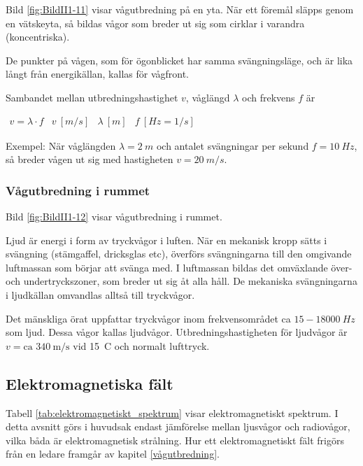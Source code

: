 Bild \ref{fig:BildII1-11} visar vågutbredning på en yta.
När ett föremål släpps genom en vätskeyta, så bildas vågor som breder ut sig
som cirklar i varandra (koncentriska).

De punkter på vågen, som för ögonblicket har samma svängningsläge, och är lika
långt från energikällan, kallas för vågfront.

Sambandet mellan utbredningshastighet \(v\), våglängd \(\lambda\) och frekvens
\(f\) är

\(
\begin{array}{llll}
v = \lambda \cdot f & v \ [m/s] & \lambda \ [m] & f \ [Hz=1/s]
\end{array}
\)

Exempel: När våglängden \(\lambda = 2\ m\) och antalet svängningar per sekund
\(f = 10\ Hz\), så breder vågen ut sig med hastigheten \(v = 20\ m/s\).

\subsubsection{Vågutbredning i rummet}


Bild \ref{fig:BildII1-12} visar vågutbredning i rummet.

Ljud är energi i form av tryckvågor i luften.
När en mekanisk kropp sätts i svängning (stämgaffel, dricksglas etc), överförs
svängningarna till den omgivande luftmassan som börjar att svänga med.
I luftmassan bildas det omväxlande över- och undertryckszoner, som breder ut
sig åt alla håll.
De mekaniska svängningarna i ljudkällan omvandlas alltså till tryckvågor.

Det mänskliga örat uppfattar tryckvågor inom frekvensområdet ca
\(15-18000\ Hz\) som ljud.
Dessa vågor kallas ljudvågor.
Utbredningshastigheten för ljudvågor är \(v = \text{ca } 340\ \text{m/s}\) vid
15~\degree C och normalt lufttryck.

\subsection{Elektromagnetiska fält}

Tabell \ref{tab:elektromagnetiskt_spektrum} visar elektromagnetiskt spektrum.
I detta avsnitt görs i huvudsak endast jämförelse mellan ljusvågor och
radiovågor, vilka båda är elektromagnetisk strålning.
Hur ett elektromagnetiskt fält frigörs från en ledare framgår av kapitel
\ref{vågutbredning}.

